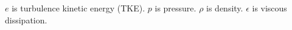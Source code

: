 $e$ is turbulence kinetic energy (TKE).  $p$ is pressure.  $\rho$ is density.  $\epsilon$ is viscous dissipation.


\endinput
